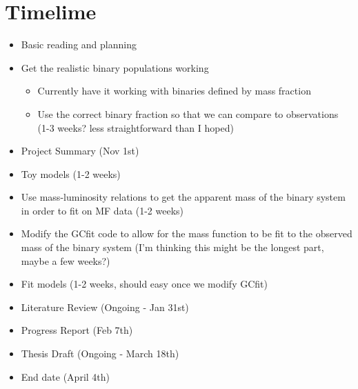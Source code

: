 \documentclass[12pt,letterpaper]{article}
\begin{document}
\section{Timelime}
\begin{itemize}
	\item Basic reading and planning \checkmark
	\item Get the realistic binary populations working
	      \begin{itemize}
		      \item Currently have it working with binaries defined by mass fraction
		            \checkmark
		      \item Use the correct binary fraction so that we can compare to observations
		            (1-3 weeks? less straightforward than I hoped)
	      \end{itemize}
	\item Project Summary (Nov 1st)
	\item Toy models (1-2 weeks)
	\item Use mass-luminosity relations to get the apparent mass of the binary system in order
	      to fit on MF data (1-2 weeks)
	\item Modify the GCfit code to allow for the mass function to be fit to the observed mass of
	      the binary system (I'm thinking this might be the longest part, maybe a few weeks?)
	\item Fit models (1-2 weeks, should easy once we modify GCfit)
	\item Literature Review (Ongoing - Jan 31st)
	\item Progress Report (Feb 7th)
	\item Thesis Draft (Ongoing - March 18th)
	\item End date (April 4th)
\end{itemize}
\end{document}
